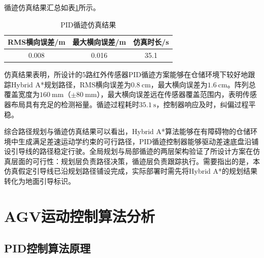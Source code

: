 {{{{    循迹仿真结果汇总如表\ref{tab:line_following_result}所示。

    \begin{table}[H]
        \centering
        \caption{PID循迹仿真结果}
        \label{tab:line_following_result}
        \begin{tabular}{ccc}
        \toprule
        RMS横向误差/m & 最大横向误差/m & 仿真时长/s \\
        \midrule
        0.008 & 0.016 & 35.1 \\
        \bottomrule
        \end{tabular}
    \end{table}

    仿真结果表明，所设计的5路红外传感器PID循迹方案能够在仓储环境下较好地跟踪Hybrid A*规划路径，RMS横向误差为$0.8\ \text{cm}$，最大横向误差为$1.6\ \text{cm}$。阵列总覆盖宽度为$160\ \text{mm}$（$\pm 80\ \text{mm}$），最大横向误差远在传感器覆盖范围内，表明传感器布局具有充足的检测裕量。循迹过程耗时$35.1\ \text{s}$，控制器响应及时，纠偏过程平稳。

        综合路径规划与循迹仿真结果可以看出，Hybrid A*算法能够在有障碍物的仓储环境中生成满足差速运动学约束的可行路径，PID循迹控制器能够驱动差速底盘沿铺设引导线的路径稳定行驶。全局规划与局部循迹的两层架构验证了所设计方案在仿真层面的可行性：规划层负责路径决策，循迹层负责跟踪执行。需要指出的是，本仿真假定引导线已沿规划路径铺设完成，实际部署时需先将Hybrid A*的规划结果转化为地面引导标识。
    }
    }
\chapter{AGV运动控制算法分析}
    \section{PID控制算法原理}
    }}
